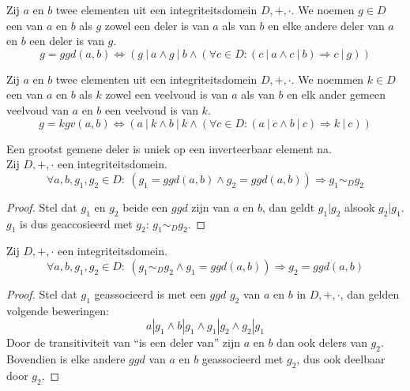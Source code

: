 \documentclass[main.tex]{subfiles}
\begin{document}
\begin{de}
  \label{de:ggd}
  Zij $a$ en $b$ twee elementen uit een integriteitsdomein $D,+,\cdot$.
  We noemen $g\in D$ een  van $a$ en $b$ als $g$ zowel een deler is van $a$ als van $b$ en elke andere deler van $a$ en $b$ een deler is van $g$.
  \[ g = ggd(a,b) \Leftrightarrow (g\ |\ a \wedge g\ |\ b \wedge (\forall c\in D: (c\ |\ a \wedge c\ |\ b) \Rightarrow c\ |\ g)) \]
\end{de}

\begin{de}
  \label{de:kgv}
  Zij $a$ en $b$ twee elementen uit een integriteitsdomein $D,+,\cdot$.
  We noemmen $k\in D$ een  van $a$ en $b$ als $k$ zowel een veelvoud is van $a$ als van $b$ en elk ander gemeen veelvoud van $a$ en $b$ een veelvoud is van $k$.
  \[ g = kgv(a,b) \Leftrightarrow (a\ |\ k \wedge b\ |\ k \wedge (\forall c\in D: (a\ |\ c \wedge b\ |\ c) \Rightarrow k\ |\ c)) \]
\end{de}

\begin{st}
  \label{st:ggd-uniek}
  Een grootst gemene deler is uniek op een inverteerbaar element na.\\
  Zij $D,+,\cdot$ een integriteitsdomein.
  \[ \forall a,b,g_{1},g_{2} \in D:\ (g_{1} = ggd(a,b) \wedge g_{2} = ggd(a,b)) \Rightarrow g_{1} \sim_{D} g_{2} \]
  \begin{proof}
    Stel dat $g_{1}$ en $g_{2}$ beide een $ggd$ zijn van $a$ en $b$, dan geldt $g_{1}|g_{2}$ alsook $g_{2}|g_{1}$.
    $g_{1}$ is dus geaccosieerd met $g_{2}$: $g_{1} \sim_{D} g_{2}$.
  \end{proof}
\end{st}

\begin{st}
  Zij $D,+,\cdot$ een integriteitsdomein.
  \[ \forall a,b,g_{1},g_{2} \in D:\ (g_{1} \sim_{D} g_{2} \wedge g_{1} = ggd(a,b)) \Rightarrow g_{2} = ggd(a,b) \]

  \begin{proof}
    Stel dat $g_{1}$ geassocieerd is met een $ggd$ $g_{2}$ van $a$ en $b$ in $D,+,\cdot$, dan gelden volgende beweringen:
    \[ a | g_{1} \wedge b | g_{1} \wedge g_{1} | g_{2} \wedge g_{2} | g_{1} \]
    Door de transitiviteit van ``is een deler van'' zijn $a$ en $b$ dan ook delers van $g_{2}$.
    Bovendien is elke andere $ggd$ van $a$ en $b$ geassocieerd met $g_{2}$, dus ook deelbaar door $g_{2}$.
  \end{proof}
\end{st}
\end{document}
